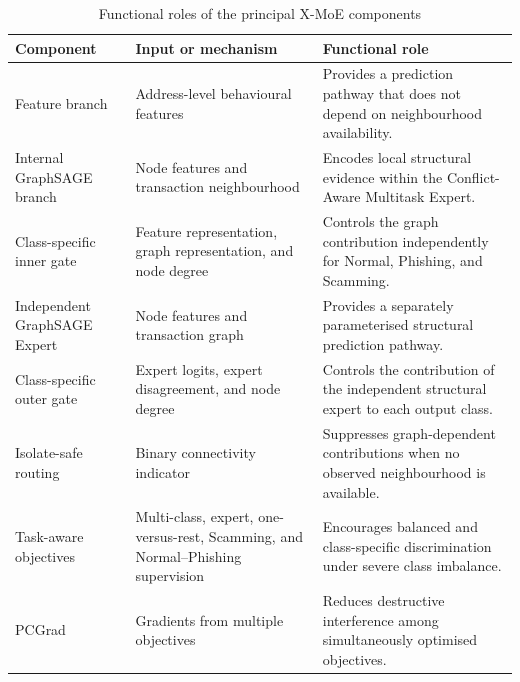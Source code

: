 \documentclass{ieeeaccess}
\begin{document}
\begin{table}[t]
\centering
\caption{Functional roles of the principal X-MoE components}
\label{tab:xmoe_components}

\renewcommand{\arraystretch}{1.12}
\setlength{\tabcolsep}{5pt}
\scriptsize

\begin{tabularx}{\textwidth}{
>{\raggedright\arraybackslash}p{3.4cm}
>{\raggedright\arraybackslash}p{4.2cm}
>{\raggedright\arraybackslash}X
}
\toprule
\textbf{Component} &
\textbf{Input or mechanism} &
\textbf{Functional role} \\
\midrule

Feature branch
&
Address-level behavioural features
&
Provides a prediction pathway that does not depend on neighbourhood availability.
\\[2pt]

Internal GraphSAGE branch
&
Node features and transaction neighbourhood
&
Encodes local structural evidence within the Conflict-Aware Multitask Expert.
\\[2pt]

Class-specific inner gate
&
Feature representation, graph representation, and node degree
&
Controls the graph contribution independently for Normal, Phishing, and Scamming.
\\[2pt]

Independent GraphSAGE Expert
&
Node features and transaction graph
&
Provides a separately parameterised structural prediction pathway.
\\[2pt]

Class-specific outer gate
&
Expert logits, expert disagreement, and node degree
&
Controls the contribution of the independent structural expert to each output class.
\\[2pt]

Isolate-safe routing
&
Binary connectivity indicator
&
Suppresses graph-dependent contributions when no observed neighbourhood is available.
\\[2pt]

Task-aware objectives
&
Multi-class, expert, one-versus-rest, Scamming, and Normal--Phishing supervision
&
Encourages balanced and class-specific discrimination under severe class imbalance.
\\[2pt]

PCGrad
&
Gradients from multiple objectives
&
Reduces destructive interference among simultaneously optimised objectives.
\\

\bottomrule
\end{tabularx}
\end{table}
\end{document}
